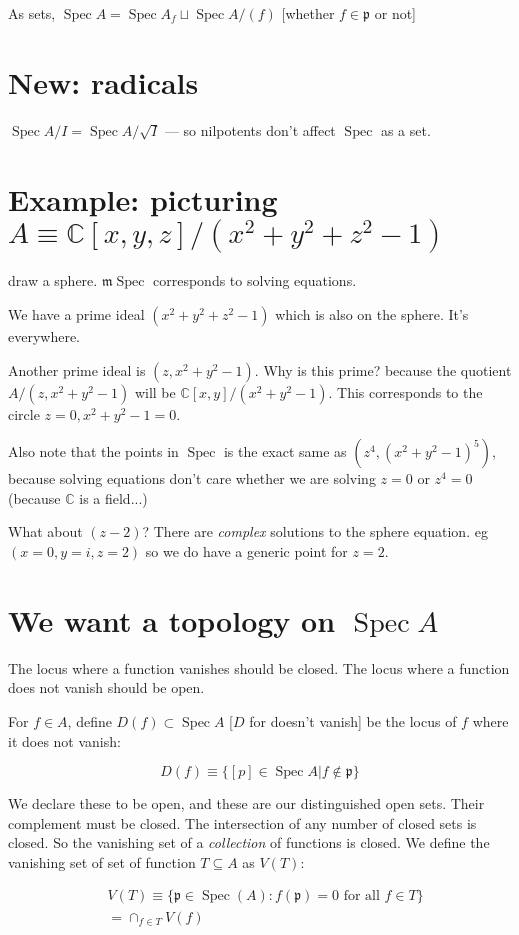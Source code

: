 \documentclass{book}
\newcommand{\C}{\ensuremath{\mathbb{C}}}
\newcommand{\Spec}{\operatorname{Spec}}
\newcommand{\spec}{\operatorname{Spec}}
\newcommand{\m}{\mathfrak{m}}
\newcommand{\p}{\mathfrak{p}}
\newcommand{\mspec}{\m\operatorname{Spec}}
\theoremstyle{definition}
\begin{document}
As sets, $\spec A = \spec A_f \sqcup \spec A/(f)$ [whether $f \in \p$ or not]

\section{New: radicals}
$\spec A/I = \spec A/\sqrt{I}$ --- so nilpotents don't affect $\spec$ as a set.

\section{Example: picturing $A \equiv \C[x, y, z]/ (x^2 + y^2 + z^2 - 1)$}
draw a sphere. $\mspec$ corresponds to solving equations. 

We have a prime ideal $(x^2 + y^2 + z^2 - 1)$ which is also on the sphere.
It's everywhere. 


Another prime ideal is $(z, x^2 + y^2 - 1)$. Why is this prime? because
the quotient $A/ (z, x^2 + y^2 - 1)$ will be $\C[x, y] / (x^2 + y^2 - 1)$.
This corresponds to the circle $z = 0, x^2 + y^2 - 1 = 0$.

Also note that the points in $\spec$ is the exact same as $(z^4, (x^2 + y^2 - 1)^5)$,
because solving equations don't care whether we are solving $z = 0$ or
$z^4 = 0$ (because $\C$ is a field...)


What about $(z - 2)$? There are \emph{complex} solutions to the sphere
equation. eg $(x = 0, y = i, z = 2)$ so we do have a generic point for $z = 2$.


\section{We want a topology on $\spec A$}
The locus where a function vanishes should be closed. The locus where a function
does not vanish should be open.

For $f \in A$, define $D(f) \subset \spec A$ [$D$ for doesn't vanish] be the
locus of $f$ where it does not vanish:

$$
D(f) \equiv \{ [p] \in \spec A | f \not \in \p \}
$$

We declare these to be open, and these are our distinguished open sets.
Their complement must be closed. The intersection of any number of closed
sets is closed. So the vanishing set of a \emph{collection} of functions
is closed. We define the vanishing set of  set of function $T \subseteq A$
as $V(T)$:

\begin{align*}
&V(T) \equiv
\{ \p \in \Spec(A) : f(\p) = 0 \text{ for all } f \in T \} \\
&= \cap_{f \in T} V(f)
\end{align*}
\end{document}
